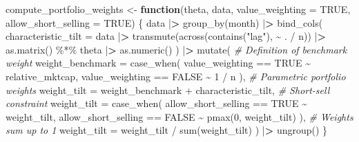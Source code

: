 \documentclass[
]{krantz}
\newenvironment{Shaded}{\begin{snugshade}}{\end{snugshade}}
\newcommand{\AttributeTok}[1]{\textcolor[rgb]{0.61,0.61,0.61}{#1}}
\newcommand{\CommentTok}[1]{\textcolor[rgb]{0.37,0.37,0.37}{\textit{#1}}}
\newcommand{\ConstantTok}[1]{\textcolor[rgb]{0,0,0}{#1}}
\newcommand{\ControlFlowTok}[1]{\textcolor[rgb]{0.27,0.27,0.27}{\textbf{#1}}}
\newcommand{\DecValTok}[1]{\textcolor[rgb]{0.06,0.06,0.06}{#1}}
\newcommand{\ErrorTok}[1]{\textcolor[rgb]{0.14,0.14,0.14}{\textbf{#1}}}
\newcommand{\FunctionTok}[1]{\textcolor[rgb]{0,0,0}{#1}}
\newcommand{\NormalTok}[1]{#1}
\newcommand{\OtherTok}[1]{\textcolor[rgb]{0.37,0.37,0.37}{#1}}
\newcommand{\SpecialCharTok}[1]{\textcolor[rgb]{0,0,0}{#1}}
\newcommand{\StringTok}[1]{\textcolor[rgb]{0.5,0.5,0.5}{#1}}
\begin{document}
\begin{Shaded}
\begin{Highlighting}[]
\NormalTok{compute\_portfolio\_weights }\OtherTok{\textless{}{-}} \ControlFlowTok{function}\NormalTok{(theta,}
\NormalTok{                                      data,}
                                      \AttributeTok{value\_weighting =} \ConstantTok{TRUE}\NormalTok{,}
                                      \AttributeTok{allow\_short\_selling =} \ConstantTok{TRUE}\NormalTok{) \{}
\NormalTok{  data }\SpecialCharTok{|}\ErrorTok{\textgreater{}}
    \FunctionTok{group\_by}\NormalTok{(month) }\SpecialCharTok{|}\ErrorTok{\textgreater{}}
    \FunctionTok{bind\_cols}\NormalTok{(}
      \AttributeTok{characteristic\_tilt =}\NormalTok{ data }\SpecialCharTok{|}\ErrorTok{\textgreater{}}
        \FunctionTok{transmute}\NormalTok{(}\FunctionTok{across}\NormalTok{(}\FunctionTok{contains}\NormalTok{(}\StringTok{"lag"}\NormalTok{), }\SpecialCharTok{\textasciitilde{}}\NormalTok{ . }\SpecialCharTok{/}\NormalTok{ n)) }\SpecialCharTok{|}\ErrorTok{\textgreater{}}
        \FunctionTok{as.matrix}\NormalTok{() }\SpecialCharTok{\%*\%}\NormalTok{ theta }\SpecialCharTok{|}\ErrorTok{\textgreater{}} \FunctionTok{as.numeric}\NormalTok{()}
\NormalTok{    ) }\SpecialCharTok{|}\ErrorTok{\textgreater{}}
    \FunctionTok{mutate}\NormalTok{(}
      \CommentTok{\# Definition of benchmark weight}
      \AttributeTok{weight\_benchmark =} \FunctionTok{case\_when}\NormalTok{(}
\NormalTok{        value\_weighting }\SpecialCharTok{==} \ConstantTok{TRUE} \SpecialCharTok{\textasciitilde{}}\NormalTok{ relative\_mktcap,}
\NormalTok{        value\_weighting }\SpecialCharTok{==} \ConstantTok{FALSE} \SpecialCharTok{\textasciitilde{}} \DecValTok{1} \SpecialCharTok{/}\NormalTok{ n}
\NormalTok{      ),}
      \CommentTok{\# Parametric portfolio weights}
      \AttributeTok{weight\_tilt =}\NormalTok{ weight\_benchmark }\SpecialCharTok{+}\NormalTok{ characteristic\_tilt,}
      \CommentTok{\# Short{-}sell constraint}
      \AttributeTok{weight\_tilt =} \FunctionTok{case\_when}\NormalTok{(}
\NormalTok{        allow\_short\_selling }\SpecialCharTok{==} \ConstantTok{TRUE} \SpecialCharTok{\textasciitilde{}}\NormalTok{ weight\_tilt,}
\NormalTok{        allow\_short\_selling }\SpecialCharTok{==} \ConstantTok{FALSE} \SpecialCharTok{\textasciitilde{}} \FunctionTok{pmax}\NormalTok{(}\DecValTok{0}\NormalTok{, weight\_tilt)}
\NormalTok{      ),}
      \CommentTok{\# Weights sum up to 1}
      \AttributeTok{weight\_tilt =}\NormalTok{ weight\_tilt }\SpecialCharTok{/} \FunctionTok{sum}\NormalTok{(weight\_tilt)}
\NormalTok{    ) }\SpecialCharTok{|}\ErrorTok{\textgreater{}}
    \FunctionTok{ungroup}\NormalTok{()}
\NormalTok{\}}
\end{Highlighting}
\end{Shaded}
\end{document}
